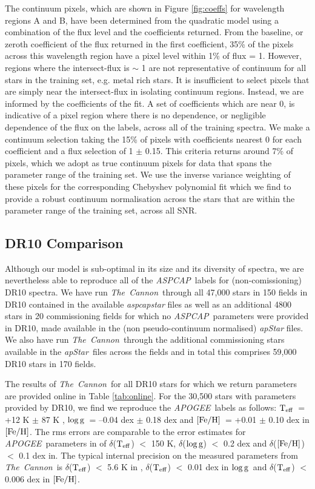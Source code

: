 \documentclass[12pt, preprint]{aastex}
\newcommand{\teff}{\mbox{$\rm T_{eff}$}}
\newcommand{\feh}{\mbox{$\rm [Fe/H]$}}
\newcommand{\logg}{\mbox{$\rm \log g$}}
\newcommand{\tc}{\textsl{The~Cannon}}
\newcommand{\apogee}{\textsl{APOGEE}}
\newcommand{\aspcap}{\textsl{ASPCAP}}
\newcommand{\apstar}{\textsl{apStar}}
\begin{document}
The continuum pixels, which are shown in Figure \ref{fig:coeffs} for wavelength regions A and B,  have been determined from the quadratic model using a combination of the flux level and the coefficients returned.  From the baseline, or zeroth coefficient of the flux returned in the first coefficient, 35\% of the pixels across this wavelength region have a pixel level within 1\% of flux = 1. However, regions where the intersect-flux is $\sim$ 1 are not representative of continuum for all stars in the training set, e.g. metal rich stars. It is insufficient to select pixels that are simply near the intersect-flux in isolating continuum regions. Instead, we are informed by the coefficients of the fit. A set of coefficients which are near 0, is indicative of a pixel region where there is no dependence, or negligible dependence of the flux on the labels, across all of the training spectra. We make a continuum selection taking the 15\% of pixels with coefficients nearest 0 for each coefficient and a flux selection of 1 $\pm$ 0.15. This criteria returns around  7\% of pixels, which we adopt as true continuum pixels for data that spans the parameter range of the training set. We use the inverse variance weighting of these pixels for the corresponding Chebyshev polynomial fit which we find to provide a robust continuum normalisation across the stars that are within the parameter range of the training set, across all SNR. 

\subsection{DR10 Comparison}

Although our model is sub-optimal in its size and its diversity of spectra, we are nevertheless able to reproduce all of the \aspcap\ labels for (non-comissioning) DR10 spectra. We have run \tc\ through all 47,000 stars in 150 fields in DR10 contained in the available \textit{aspcapstar} files as well as an additional 4800 stars in 20 commissioning fields for which no \aspcap\ parameters were provided in DR10, made available in the (non pseudo-continuum normalised) \textit{apStar} files. We also have run \tc\ through the additional commissioning stars available in the \apstar\ files across the fields and in total this comprises 59,000 DR10 stars in 170 fields. %

The results of \tc\ for all DR10 stars for which we return parameters are provided online in Table \ref{tab:online}. For the 30,500 stars with parameters provided by DR10, we find we reproduce the \apogee\ labels as follows: \teff\ = +12 K $\pm$ 87 K ,  \logg\ = --0.04 dex $\pm$  0.18 dex and \feh\ = +0.01 $\pm$ 0.10 dex in \feh. The rms errors are comparable to the error estimates for \apogee\ parameters in \citet{Meszaros2013} of $\delta$(\teff) $<$ 150 K, $\delta$(\logg) $<$  0.2 dex and $\delta$(\feh) $<$  0.1 dex in.  The typical internal precision on the measured parameters from \tc\ is  $\delta$(\teff) $<$ 5.6 K in ,  $\delta$(\teff) $<$ 0.01 dex in \logg\ and  $\delta$(\teff) $<$ 0.006 dex in \feh.
\end{document}
